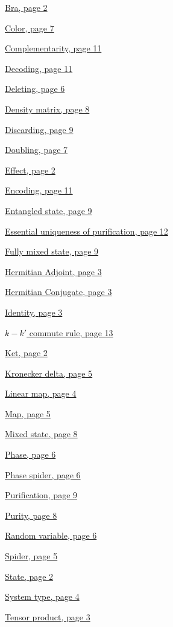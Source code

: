 \documentclass[]{article}
\begin{document}
\hyperref[braandket]{Bra, page 2}

\hyperref[coloursandbases]{Color, page 7}

\hyperref[complementarity]{Complementarity, page 11}

\hyperref[encodingdecoding]{Decoding, page 11}

\hyperref[spiders]{Deleting, page 6}

\hyperref[doubling]{Density matrix, page 8}

\hyperref[discarding]{Discarding, page 9}

\hyperref[doubling]{Doubling, page 7}

\hyperref[braandket]{Effect, page 2}

\hyperref[encodingdecoding]{Encoding, page 11}

\hyperref[entanglement]{Entangled state, page 9}

\hyperref[section:essentialuniqueness]{Essential uniqueness of purification, page 12}

\hyperref[discarding]{Fully mixed state, page 9}

\hyperref[braandket]{Hermitian Adjoint, page 3}

\hyperref[braandket]{Hermitian Conjugate, page 3}

\hyperref[identity]{Identity, page 3}

\hyperref[section:kkcommute]{$k-k'$ commute rule, page 13}

\hyperref[braandket]{Ket, page 2}

\hyperref[spiders]{Kronecker delta, page 5}

\hyperref[maps]{Linear map, page 4}

\hyperref[maps]{Map, page 5}

\hyperref[doubling]{Mixed state, page 8}

\hyperref[phasespiders]{Phase, page 6}

\hyperref[phasespiders]{Phase spider, page 6}

\hyperref[discarding]{Purification, page 9}

\hyperref[doubling]{Purity, page 8}

\hyperref[spiders]{Random variable, page 6}

\hyperref[spiders]{Spider, page 5}

\hyperref[braandket]{State, page 2}

\hyperref[identity]{System type, page 4}

\hyperref[section:tensorproduct]{Tensor product, page 3}
\end{document}
